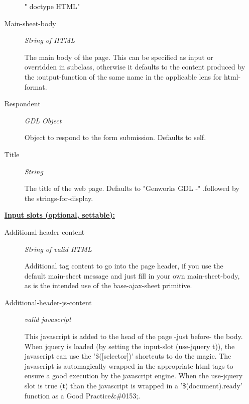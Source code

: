\documentclass [11pt]{book}
\begin{document}
\begin{itemize}
\begin{description}
"
\!doctype{ HTML}"




\item [Main-sheet-body]
\emph{String of HTML}

 The main body of the page.
This can be specified as input or overridden in subclass, otherwise it defaults
to the content produced by the :output-function of the same name
in the applicable lens for  html-format.




\item [Respondent]
\emph{GDL Object}

 Object to respond to the form submission. Defaults to self.




\item [Title]
\emph{String}

 The title of the web page. Defaults to "Genworks GDL -"
.followed by the strings-for-display.




\end{description}






\textbf{
\underline{Input slots (optional, settable):}}

\begin{description}

\item [Additional-header-content]
\emph{String of valid HTML}

 Additional tag content to go into the page header,
if you use the default main-sheet message and just fill in your own main-sheet-body, as
is the intended use of the base-ajax-sheet primitive.




\item [Additional-header-js-content]
\emph{valid javascript}

 This javascript is added to the head of the page -just before- the body.
When jquery is loaded (by setting the input-slot (use-jquery t)), the javascript can use the
'\$([selector])' shortcuts to do the magic. The javascript is automagically wrapped in the
appropriate html tags to ensure a good execution by the javascript engine. When the use-jquery
slot is true (t) than the javascript is wrapped in a '\$(document).ready' function as a
Good Practice&\#0153;.





\end{description}
\end{itemize}
\end{document}
